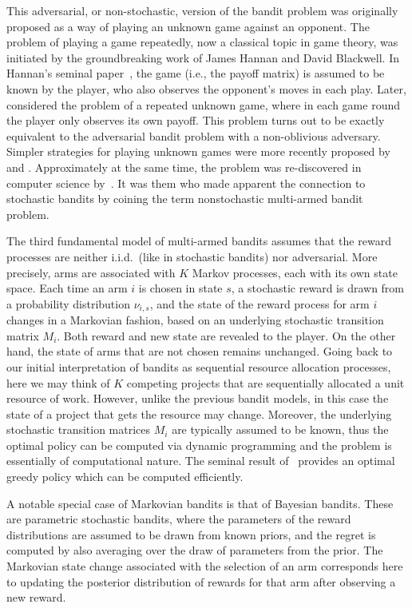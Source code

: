 \documentclass[11pt]{hackednow}
\begin{document}
This adversarial, or non-stochastic, version of the bandit problem was originally proposed as a way of playing an unknown game against an opponent. The problem of playing a game repeatedly, now a classical topic in game theory, was initiated by the groundbreaking work of James Hannan and David Blackwell. In Hannan's seminal paper~\cite{Han57}, the game (i.e., the payoff matrix) is assumed to be known by the player, who also observes the opponent's moves in each play. Later, \cite{Ban68} considered the problem of a repeated unknown game, where in each game round the player only observes its own payoff. This problem turns out to be exactly equivalent to the adversarial bandit problem with a non-oblivious adversary. Simpler strategies for playing unknown games were more recently proposed by \cite{FoVo98} and \cite{HaMa99,HaMa00}. Approximately at the same time, the problem was re-discovered in computer science by~\cite{ACFS03}. It was them who made apparent the connection to stochastic bandits by coining the term nonstochastic multi-armed bandit problem. 

The third fundamental model of multi-armed bandits assumes that the reward processes are neither i.i.d.\ (like in stochastic bandits) nor adversarial. More precisely, arms are associated with $K$ Markov processes, each with its own state space. Each time an arm $i$ is chosen in state $s$, a stochastic reward is drawn from a probability distribution $\nu_{i,s}$, and the state of the reward process for arm $i$ changes in a Markovian fashion, based on an underlying stochastic transition matrix $M_i$. Both reward and new state are revealed to the player. On the other hand, the state of arms that are not chosen remains unchanged. Going back to our initial interpretation of bandits as sequential resource allocation processes, here we may think of $K$ competing projects that are sequentially allocated a unit resource of work. However, unlike the previous bandit models, in this case the state of a project that gets the resource may change. Moreover, the underlying stochastic transition matrices $M_i$ are typically assumed to be known, thus the optimal policy can be computed via dynamic programming and the problem is essentially of computational nature. The seminal result of~\cite{gittins1979bandit} provides an optimal greedy policy which can be computed efficiently.

A notable special case of Markovian bandits is that of Bayesian bandits. These are parametric stochastic bandits, where the parameters of the reward distributions are assumed to be drawn from known priors, and the regret is computed by also averaging over the draw of parameters from the prior. The Markovian state change associated with the selection of an arm corresponds here to updating the posterior distribution of rewards for that arm after observing a new reward.
\end{document}
